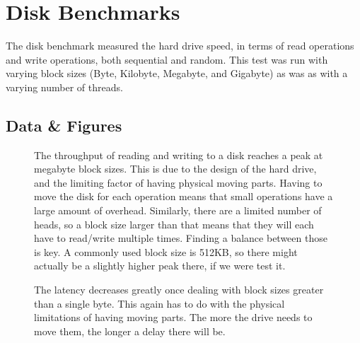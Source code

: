 \documentclass{article}
\begin{document}
\section{Disk Benchmarks}
The disk benchmark measured the hard drive speed, in terms of read operations and write operations, both sequential and random.  This test was run with varying block sizes (Byte, Kilobyte, Megabyte, and Gigabyte) as was as with a varying number of threads.
\subsection{Data \& Figures}
\begin{figure}[H]

The throughput of reading and writing to a disk reaches a peak at megabyte block sizes.  This is due to the design of the hard drive, and the limiting factor of having physical moving parts.  Having to move the disk for each operation means that small operations have a large amount of overhead.  Similarly, there are a limited number of heads, so a block size larger than that means that they will each have to read/write multiple times.  Finding a balance between those is key.  A commonly used block size is 512KB, so there might actually be a slightly higher peak there, if we were test it.  \\

\end{figure}
\begin{figure}[H]

The latency decreases greatly once dealing with block sizes greater than a single byte.  This again has to do with the physical limitations of having moving parts.  The more the drive needs to move them, the longer a delay there will be.
\end{figure}
\end{document}
